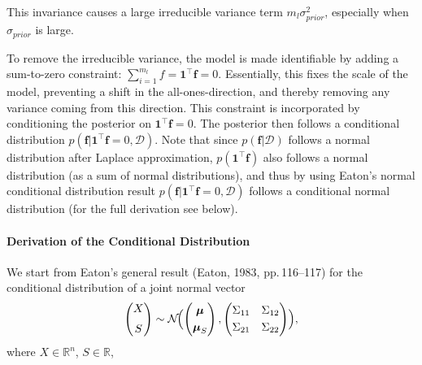 \documentclass{article}
\begin{document}
This invariance causes a large irreducible variance term $m_l \sigma_{prior}^2$, especially when $\sigma_{prior}$ is large. 

To remove the irreducible variance, the model is made identifiable by adding a sum-to-zero constraint: $\sum_{i=1}^{m_l}f = \mathbf{1}^\top\mathbf{f} = 0$. Essentially, this fixes the scale of the model, preventing a shift in the all-ones-direction, and thereby removing any variance coming from this direction. This constraint is incorporated by conditioning the posterior on $\mathbf{1}^\top\mathbf{f} = 0$. The posterior then follows a conditional distribution $p(\mathbf{f}|\mathbf{1}^\top\mathbf{f} = 0, \mathcal{D})$. Note that since $p(\mathbf{f}|\mathcal{D})$ follows a normal distribution after Laplace approximation, $p(\mathbf{1}^\top\mathbf{f})$ also follows a normal distribution (as a sum of normal distributions), and thus by using Eaton's \cite{Eaton2007} normal conditional distribution result $p(\mathbf{f}|\mathbf{1}^\top\mathbf{f} = 0, \mathcal{D})$ follows a conditional normal distribution (for the full derivation see below).

\paragraph{Derivation of the Conditional Distribution}

We start from Eaton’s general result (Eaton, 1983, pp.\,116--117) for the conditional distribution of a joint normal vector
\[
\begin{pmatrix}
X \\[6pt]
S
\end{pmatrix}
\sim
\mathcal{N}\!\Bigl(
\begin{pmatrix}\boldsymbol{\mu} \\[3pt] \boldsymbol{\mu}_S\end{pmatrix},
\begin{pmatrix}
\Sigma_{11} & \Sigma_{12} \\[3pt]
\Sigma_{21} & \Sigma_{22}
\end{pmatrix}
\Bigr),
\]
where \(X\in\mathbb{R}^n\), \(S\in\mathbb{R}\), 
\end{document}

